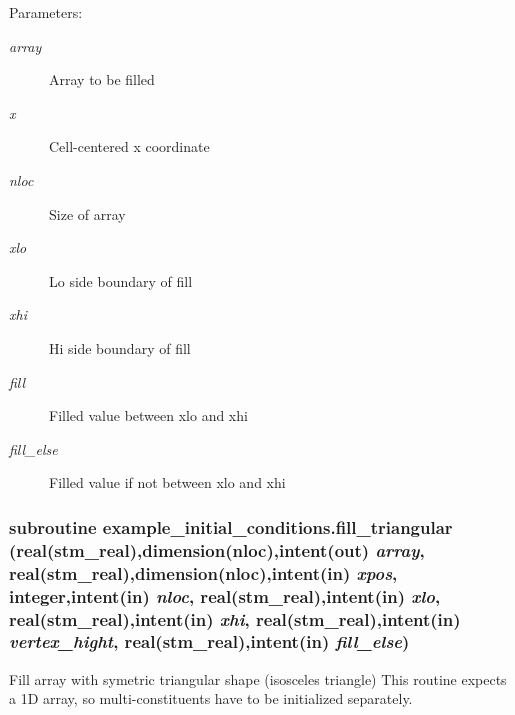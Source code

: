 \begin{Desc}
\item[Parameters:]
\begin{description}
\item[{\em array}]Array to be filled\item[{\em x}]Cell-centered x coordinate\item[{\em nloc}]Size of array\item[{\em xlo}]Lo side boundary of fill\item[{\em xhi}]Hi side boundary of fill\item[{\em fill}]Filled value between xlo and xhi\item[{\em fill\_\-else}]Filled value if not between xlo and xhi \end{description}
\end{Desc}
\hypertarget{a00059_c94c30ffbfa4a942dc74dbe5bcf85b32}{
\subsubsection[{fill\_\-triangular}]{\setlength{\rightskip}{0pt plus 5cm}subroutine example\_\-initial\_\-conditions.fill\_\-triangular (real(stm\_\-real),dimension(nloc),intent(out) {\em array}, \/  real(stm\_\-real),dimension(nloc),intent(in) {\em xpos}, \/  integer,intent(in) {\em nloc}, \/  real(stm\_\-real),intent(in) {\em xlo}, \/  real(stm\_\-real),intent(in) {\em xhi}, \/  real(stm\_\-real),intent(in) {\em vertex\_\-hight}, \/  real(stm\_\-real),intent(in) {\em fill\_\-else})}}
\label{a00059_c94c30ffbfa4a942dc74dbe5bcf85b32}


Fill array with symetric triangular shape (isosceles triangle) This routine expects a 1D array, so multi-constituents have to be initialized separately. 

